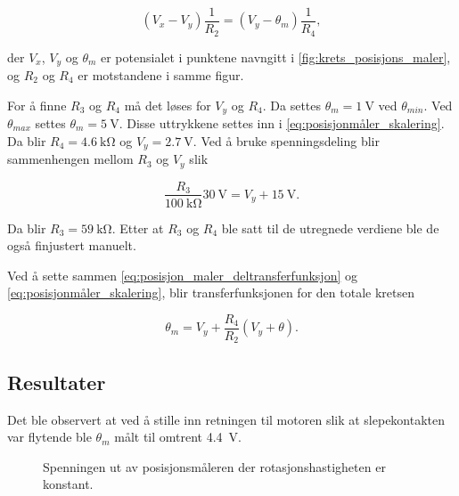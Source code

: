 \begin{equation}
    \label{eq:posisjonmåler_skalering}
    (V_x - V_y) \frac{1}{R_2} = (V_y - \theta_m) \frac{1}{R_4},
\end{equation}

der $V_x$, $V_y$ og $\theta_m$ er potensialet i punktene navngitt i \autoref{fig:krets_posisjons_maler}, og $R_2$ og $R_4$ er motstandene i samme figur.

For å finne $R_3$ og $R_4$ må det løses for $V_y$ og $R_4$.
Da settes $\theta_m = \SI{1}{\volt}$ ved $\theta_{min}$.
Ved $\theta_{max}$ settes $\theta_m = \SI{5}{\volt}$.
Disse uttrykkene settes inn i \eqref{eq:posisjonmåler_skalering}. 
Da blir $R_4 = \SI{4.6}{\kilo\ohm}$ og 
$V_y = \SI{2.7}{\volt}$.
Ved å bruke spenningsdeling blir sammenhengen mellom $R_3$ og $V_y$ slik

\begin{equation}
    \label{eq:posisjon_maler_R3}
    \frac{R_3}{\SI{100}{\kilo\ohm}} \SI{30}{\volt} = V_y + \SI{15}{\volt}.
\end{equation}

Da blir $R_3 = \SI{59}{\kilo\ohm}$. Etter at $R_3$ og $R_4$ ble satt til de utregnede verdiene ble de også finjustert manuelt.

Ved å sette sammen \eqref{eq:posisjon_maler_deltransferfunksjon} og \eqref{eq:posisjonmåler_skalering}, blir transferfunksjonen for den totale kretsen

\begin{equation}
    \label{eq:posisjon_maling_transferfuksjon}
    \theta_m = V_y + \frac{R_4}{R_2}(V_y + \theta).
\end{equation}






\subsection{Resultater}

\label{obs:floating_potensiometer}
Det ble observert at ved å stille inn retningen til motoren slik at slepekontakten var flytende ble $\theta_m$ målt til omtrent \SI{4.4}{\volt}.

\begin{figure}[h]
    \centering
    
    \caption{Spenningen ut av posisjonsmåleren der rotasjonshastigheten er konstant.}
    \label{fig:posisjon_sagtann}
\end{figure}






